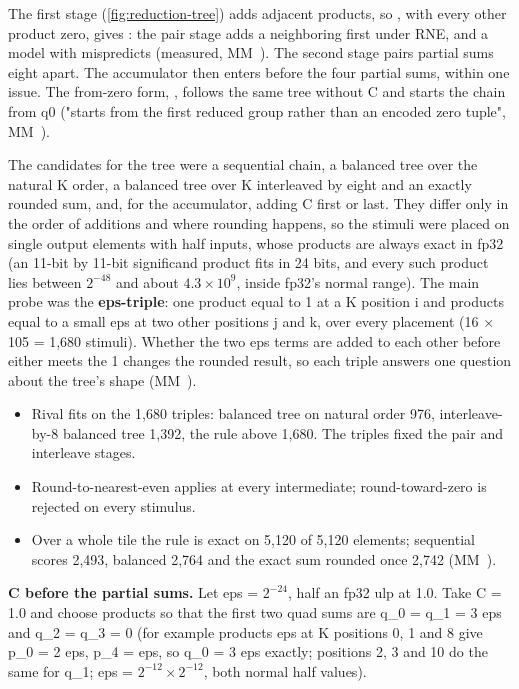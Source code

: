 

The first stage (\cref{fig:reduction-tree}) adds adjacent products, so , with every
other product zero, gives : the pair stage adds a neighboring  first under RNE, and a model with
 mispredicts (measured, MM~). The second stage pairs partial sums eight apart. The
accumulator then enters before the four partial sums, within one issue. The from-zero form, , follows the same tree without C and starts the chain from q0 ("starts from the first reduced
group rather than an encoded zero tuple", MM~).

The candidates for the tree were a sequential chain, a balanced tree over the natural K order, a
balanced tree over K interleaved by eight and an exactly rounded sum, and, for the accumulator, adding C first or last.
They differ only in the order of additions and where rounding happens, so the stimuli were placed on single output elements
with half inputs, whose products are always exact in fp32 (an 11-bit by 11-bit significand product fits in 24 bits, and
every such product lies between $2^{-48}$ and about $4.3 \times 10^{9}$, inside fp32's normal range). The main probe was the \textbf{eps-triple}: one product
equal to 1 at a K position i and products equal to a small eps at two other positions j and k, over every placement
(16 × 105 = 1,680 stimuli). Whether the two eps terms are added to each other before either meets the 1 changes the
rounded result, so each triple answers one question about the tree's shape (MM~).

\begin{itemize}
\item Rival fits on the 1,680 triples: balanced tree on natural order 976, interleave-by-8 balanced tree 1,392, the rule
  above 1,680. The triples fixed the pair and interleave stages.
\item Round-to-nearest-even applies at every intermediate; round-toward-zero is rejected on every stimulus.
\item Over a whole tile the rule is exact on 5,120 of 5,120 elements; sequential scores 2,493, balanced 2,764 and
  the exact sum rounded once 2,742 (MM~).
\end{itemize}

\textbf{C before the partial sums.} Let eps = $2^{-24}$, half an fp32 ulp at 1.0. Take C = 1.0 and choose products so that the first two
quad sums are q\_0 = q\_1 = 3 eps and q\_2 = q\_3 = 0 (for example products eps at K positions 0, 1 and 8 give
p\_0 = 2 eps, p\_4 = eps, so q\_0 = 3 eps exactly; positions 2, 3 and 10 do the same for q\_1; eps = $2^{-12} \times 2^{-12}$, both
normal half values).


